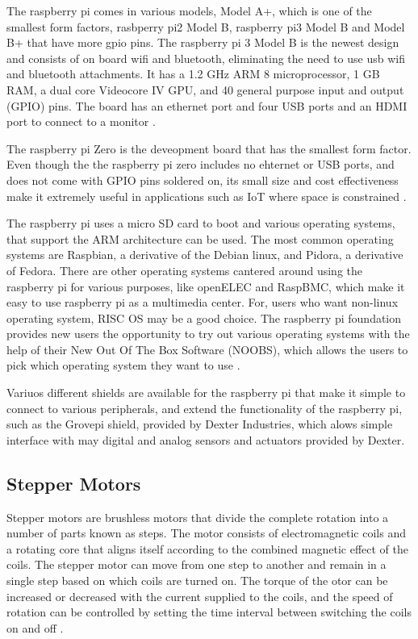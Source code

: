 \documentclass[sigconf]{acmart}
\begin{document}
The raspberry pi comes in various models, Model A+, which is one of the smallest form factors, rasbperry pi2 Model B, raspberry pi3 Model B and Model B+ that have more gpio pins. The raspberry pi 3 Model B is the newest design and consists of on board wifi and bluetooth, eliminating the need to use usb wifi and bluetooth attachments. It has a 1.2 GHz ARM 8 microprocessor, 1 GB RAM, a dual core Videocore IV GPU, and 40 general purpose input and output (GPIO) pins. The board has an ethernet port and four USB ports and an HDMI port to connect to a monitor \cite{pi-compare}\cite{element-compare}.

The raspberry pi Zero is the deveopment board that has the smallest form factor. Even though the the raspberry pi zero includes no ehternet or USB ports, and does not come with GPIO pins soldered on, its small size and cost effectiveness make it extremely useful in applications such as IoT where space is constrained \cite{official-pi-zero}.

The raspberry pi uses a micro SD card to boot and various operating systems, that support the ARM architecture can be used. The most common operating systems are Raspbian, a derivative of the Debian linux, and Pidora, a derivative of Fedora. There are other operating systems cantered around using the raspberry pi for various purposes, like openELEC and RaspBMC, which make it easy to use raspberry pi as a multimedia center. For, users who want non-linux operating system, RISC OS may be a good choice. The raspberry pi foundation provides new users the opportunity to try out various operating systems with the help of their New Out  Of The Box Software (NOOBS), which allows the users to pick which operating system they want to use \cite{os-pi}.

Variuos different shields are available for the raspberry pi that make it simple to connect to various peripherals, and extend the functionality of the raspberry pi, such as the Grovepi shield, provided by Dexter Industries, which alows simple interface with may digital and analog sensors and actuators provided by Dexter.

\subsection{Stepper Motors}
Stepper motors are brushless motors that divide the complete rotation into a number of parts known as steps. The motor consists of electromagnetic coils and a rotating core that aligns itself according to the combined magnetic effect of the coils. The stepper motor can move from one step to another and remain in a single step based on which coils are turned on. The torque of the otor can be increased or decreased with the current supplied to the coils, and the speed of rotation can be controlled by setting the time interval between switching the coils on and off \cite{wiki-stepper}.
\end{document}
